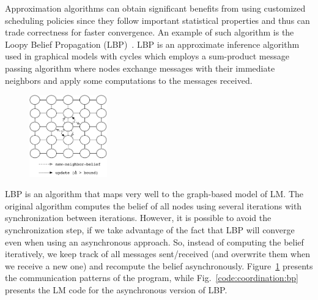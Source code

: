 Approximation algorithms can obtain significant benefits from using customized
scheduling policies since they follow important statistical properties and thus
can trade correctness for faster convergence. An example of such algorithm is
the Loopy Belief Propagation (LBP)~\cite{Murphy99loopybelief}. LBP is an
approximate inference algorithm used in graphical models with cycles which
employs a sum-product message passing algorithm where nodes exchange messages
with their immediate neighbors and apply some computations to the messages
received.

\begin{figure}[h]
   \begin{center}
      \includegraphics[width=0.3\textwidth]{figures/bp/bp.pdf}
   \end{center}


\label{fig:coordination:bp}
\end{figure}

LBP is an algorithm that maps very well to the graph-based model of LM. The
original algorithm computes the belief of all nodes using several iterations
with synchronization between iterations. However, it is possible to avoid the
synchronization step, if we take advantage of the fact that LBP will converge
even when using an asynchronous approach. So, instead of computing the belief
iteratively, we keep track of all messages sent/received (and overwrite them
when we receive a new one) and recompute the belief asynchronously.
Figure~\ref{fig:coordination:bp} presents the communication patterns of the
program, while Fig.~\ref{code:coordination:bp} presents the LM code for the
asynchronous version of LBP.

